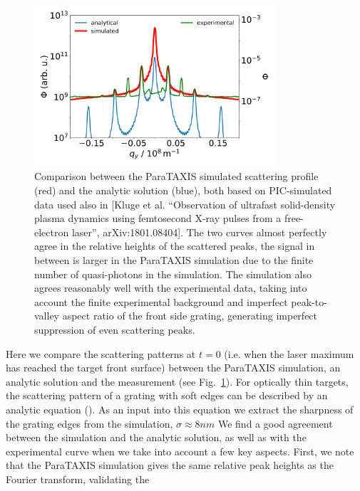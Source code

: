 \documentclass[10pt]{scrartcl}
\begin{document}
\begin{figure}
  \begin{center}
    \includegraphics[width=0.8\textwidth]{figures/parataxis_vs_ln04.png}
    \caption{Comparison between the ParaTAXIS simulated scattering profile
      (red)
      and the analytic solution (blue), both based on PIC-simulated data
      used
      also in [Kluge et al. ``Observation of ultrafast solid-density
        plasma
        dynamics using femtosecond X-ray pulses from a free-electron
        laser'',
      arXiv:1801.08404].
      The two curves almost perfectly agree in the relative
      heights of the scattered peaks, the signal in between is
      larger in the ParaTAXIS simulation due to the finite number of
      quasi-photons in the simulation.
      The simulation also agrees reasonably well with the
      experimental data, taking into account the finite experimental
      background  and imperfect peak-to-valley aspect ratio of the front
      side grating, generating imperfect suppression of even scattering
      peaks.
    }\label{fig:parataxis_vs_ln04}
  \end{center}
\end{figure}
%
Here we compare the scattering patterns at $t=0$ (i.e. when the laser maximum
has reached the target front surface) between the ParaTAXIS simulation, an
analytic solution and the measurement (see Fig.~\ref{fig:parataxis_vs_ln04}).
For optically
thin targets, the scattering pattern of a grating with soft edges can be
described by an analytic equation (\cite{Kluge2018}). As an input into this equation
we extract the sharpness of the grating edges from the simulation,
$\sigma\approx 8 nm$ We find a good agreement between the simulation and the
analytic solution, as well as with the experimental curve when we take into
account a few key aspects.  First, we note that the ParaTAXIS simulation gives
the same relative peak heights as the Fourier transform, validating the
\end{document}

